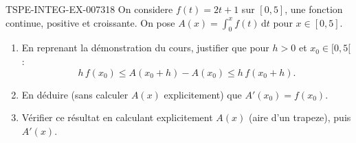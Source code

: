 \begin{exercice}{TSPE-INTEG-EX-007}{3}{18}
On considere $f(t) = 2t+1$ sur $[0,5]$, une fonction continue, positive et croissante. On pose $A(x) = \displaystyle\int_0^x f(t)\,\mathrm{d}t$ pour $x \in [0,5]$.
\begin{enumerate}
  \item En reprenant la démonstration du cours, justifier que pour $h>0$ et $x_0 \in [0,5[$ :
  \[
    h\,f(x_0) \leq A(x_0+h) - A(x_0) \leq h\,f(x_0+h).
  \]
  \item En déduire (sans calculer $A(x)$ explicitement) que $A'(x_0) = f(x_0)$.
  \item Vérifier ce résultat en calculant explicitement $A(x)$ (aire d'un trapeze), puis $A'(x)$.
\end{enumerate}
\end{exercice}
